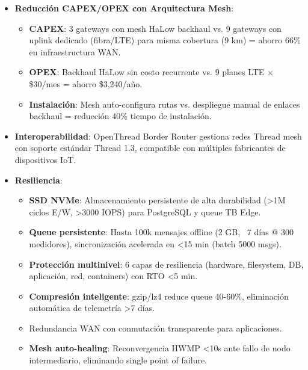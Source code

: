 \begin{itemize}
    \item \textbf{Reducción CAPEX/OPEX con Arquitectura Mesh}:
    \begin{itemize}
        \item \textbf{CAPEX}: 3 gateways con mesh HaLow backhaul vs. 9 gateways con uplink dedicado (fibra/LTE) para misma cobertura (9 km) = ahorro 66\% en infraestructura WAN.
        \item \textbf{OPEX}: Backhaul HaLow sin costo recurrente vs. 9 planes LTE $\times$ \$30/mes = ahorro \$3,240/año.
        \item \textbf{Instalación}: Mesh auto-configura rutas vs. despliegue manual de enlaces backhaul = reducción 40\% tiempo de instalación.
    \end{itemize}
    
    \item \textbf{Interoperabilidad}: OpenThread Border Router gestiona redes Thread mesh con soporte estándar Thread 1.3, compatible con múltiples fabricantes de dispositivos IoT.
    
    \item \textbf{Resiliencia}: 
    \begin{itemize}
        \item \textbf{SSD NVMe}: Almacenamiento persistente de alta durabilidad (>1M ciclos E/W, >3000 IOPS) para PostgreSQL y queue TB Edge.
        \item \textbf{Queue persistente}: Hasta 100k mensajes offline (2 GB, ~7 días @ 300 medidores), sincronización acelerada en <15 min (batch 5000 msgs).
        \item \textbf{Protección multinivel}: 6 capas de resiliencia (hardware, filesystem, DB, aplicación, red, containers) con RTO <5 min.
        \item \textbf{Compresión inteligente}: gzip/lz4 reduce queue 40-60\%, eliminación automática de telemetría >7 días.
        \item Redundancia WAN con conmutación transparente para aplicaciones.
        \item \textbf{Mesh auto-healing}: Reconvergencia HWMP <10s ante fallo de nodo intermediario, eliminando single point of failure.
    \end{itemize}
    

\end{itemize}
